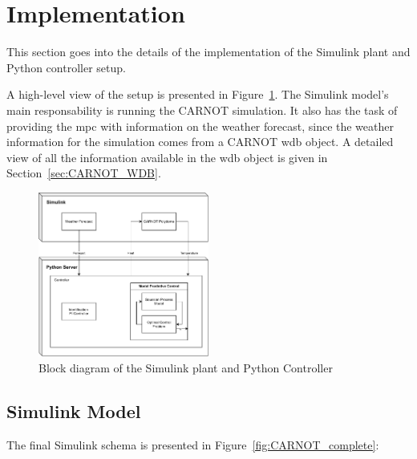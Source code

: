 \section{Implementation}

This section goes into the details of the implementation of the Simulink plant
and Python controller setup.

A high-level view of the setup is presented in Figure~\ref{fig:setup_diagram}.
The Simulink model's main responsability is running the CARNOT simulation. It
also has the task of providing the \acrshort{mpc} with information on the
weather forecast, since the weather information for the simulation comes from a
CARNOT \acrshort{wdb} object. A detailed view of all the information available
in the \acrshort{wdb} object is given in Section~\ref{sec:CARNOT_WDB}.


\begin{figure}[ht]
    \centering
    \includegraphics[width = 0.5\textwidth]{Images/setup_diagram.pdf}
    \caption{Block diagram of the Simulink plant and Python Controller}
    \label{fig:setup_diagram}
\end{figure}

\subsection{Simulink Model}



The final Simulink schema is presented in Figure~\ref{fig:CARNOT_complete}:

